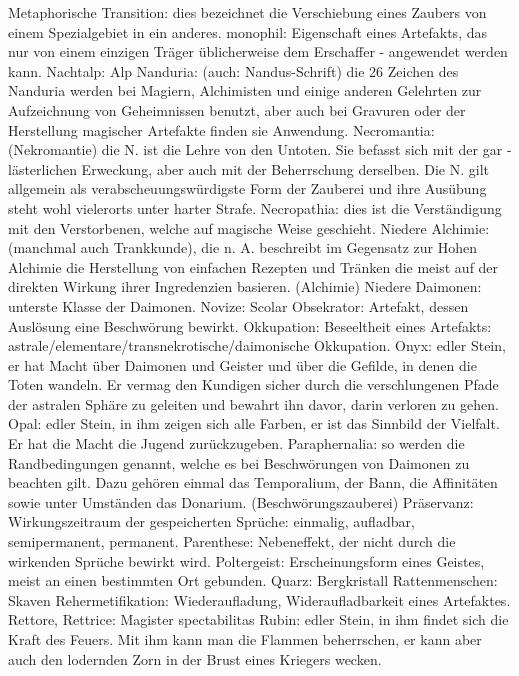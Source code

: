 \documentclass[a5paper,8pt]{book}
\begin{document}
Metaphorische Transition: dies bezeichnet die Ver­schiebung eines Zaubers von einem Spezialgebiet in ein anderes.
monophil: Eigenschaft eines Artefakts, das nur von einem einzigen Träger üblicherweise dem Erschaffer - angewendet werden kann.
Nachtalp: \textit{}Alp
Nanduria: (auch: Nandus-Schrift) die 26 Zeichen des Nanduria werden bei Magiern, Alchimisten und einige anderen Gelehrten zur Aufzeichnung von Geheimnissen benutzt, aber auch bei Gravuren oder der Herstellung magischer \textit{}Artefakte finden sie Anwendung.
Necromantia: (Nekromantie) die N. ist die Lehre von den \textit{}Untoten. Sie befasst sich mit der gar ­lästerlichen Erweckung, aber auch mit der Beherrschung derselben. Die N. gilt allgemein als ver­abscheuungs­würdigste Form der Zauberei und ihre Aus­übung steht wohl vielerorts unter harter Strafe.
Necropathia: dies ist die Ver­ständigung mit den Verstorbenen, welche auf magische Weise geschieht.
Niedere Alchimie: (manchmal auch Trankkunde), die n. A. beschreibt im Gegensatz zur \textit{}Hohen Alchimie die Herstellung von einfachen Rezepten und Tränken die meist auf der direkten Wirkung ihrer Ingredenzien basieren. (\textit{}Alchimie)
Niedere Daimonen: unterste Klasse der \textit{}Daimonen. 
Novize: \textit{}Scolar
Obsekrator: Artefakt, dessen Auslösung eine \textit{}Beschwörung bewirkt.
Okkupation: Beseeltheit eines Artefakts: astrale/­elementare/­­transnekrotische/­daimonische Okkupation.
Onyx: edler Stein, er hat Macht über \textit{}Daimonen und \textit{}Geister und über die Gefilde, in denen die Toten wandeln. Er vermag den Kundigen sicher durch die verschlungenen Pfade der astralen Sphäre zu geleiten und bewahrt ihn davor, darin verloren zu gehen.
Opal: edler Stein, in ihm zeigen sich alle Farben, er ist das Sinnbild der Vielfalt. Er hat die Macht die Jugend zurückzugeben.
Paraphernalia: so werden die Randbedingungen ge­nannt, welche es bei Beschwörungen von \textit{}Daimonen zu beachten gilt. Dazu gehören einmal das \textit{}Temporalium, der Bann, die \textit{}Affinitäten sowie unter Um­ständen das \textit{}Donarium. (\textit{}Beschwörungszauberei)
Präservanz: Wirkungszeitraum der gespeicherten Sprüche: einmalig, aufladbar, semipermanent, permanent.
Parenthese: Nebeneffekt, der nicht durch die wirkenden Sprüche bewirkt wird.
Poltergeist: Erscheinungsform eines \textit{}Geistes, meist an einen bestimmten Ort gebunden.
Quarz: \textit{}Bergkristall
Rattenmenschen: \textit{}Skaven
Rehermetifikation: Wiederaufladung, Wideraufladbarkeit eines Artefaktes.
Rettore, Rettrice: \textit{}Magister spectabilitas
Rubin: edler Stein, in ihm findet sich die Kraft des Feuers. Mit ihm kann man die Flammen beherrschen, er kann aber auch den lodernden Zorn in der Brust eines Kriegers wecken.
\end{document}
